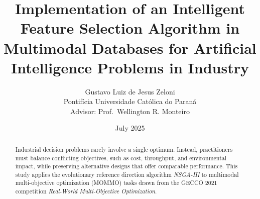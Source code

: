 \documentclass[12pt,a4paper]{article}
\title{Implementation of an Intelligent Feature Selection Algorithm in Multimodal Databases for Artificial Intelligence Problems in Industry}
\author{Gustavo Luiz de Jesus Zeloni\\Pontifícia Universidade Católica do Paraná\\Advisor: Prof.~Wellington R. Monteiro}
\date{July 2025}
\begin{document}
\maketitle
\thispagestyle{empty}
\newpage

\begin{abstract}
Industrial decision problems rarely involve a single optimum. Instead, practitioners must balance conflicting objectives, such as cost, throughput, and environmental impact, while preserving alternative designs that offer comparable performance. This study applies the evolutionary reference direction algorithm \emph{NSGA-III} to multimodal multi-objective optimization (MOMMO) tasks drawn from the GECCO 2021 competition \emph{Real-World Multi-Objective Optimization}.
\end{abstract}
\end{document}
